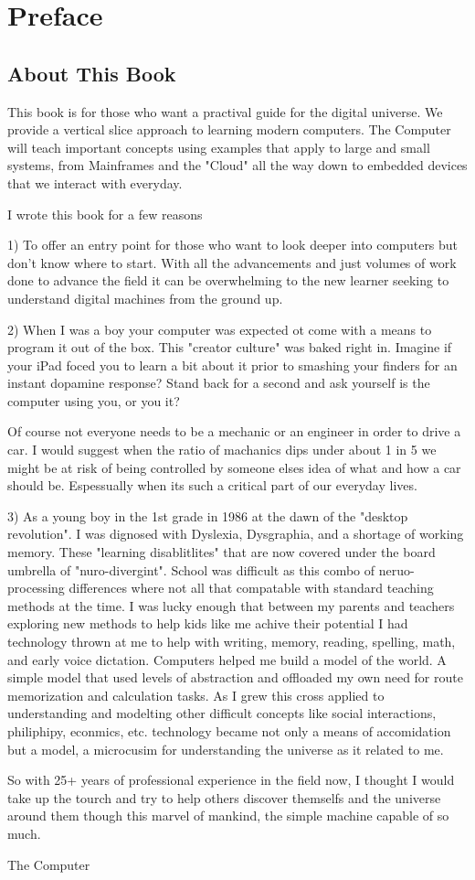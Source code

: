 \chapter{Preface}
\section{About This Book}

This book is for those who want a practival guide for the digital universe. We provide a vertical slice approach to learning modern computers. The Computer will teach important concepts using examples that apply to large and small systems, from Mainframes and the "Cloud" all the way down to embedded devices that we interact with everyday.

I wrote this book for a few reasons

1) To offer an entry point for those who want to  look deeper into computers but don't know where to start. With all the advancements and just volumes of work done to advance the field it can be overwhelming to the new learner seeking to understand digital machines from the ground up.

2) When I was a boy your computer was expected ot come with a means to program it out of the box. This "creator culture" was baked right in. Imagine if your iPad foced you to learn a bit about it prior to smashing your finders for an instant dopamine response? Stand back for a second and ask yourself is the computer using you, or you it?

Of course not everyone needs to be a mechanic or an engineer in order to drive a car. I would suggest when the ratio of machanics dips under about 1 in 5 we might be at risk of being controlled by someone elses idea of what and how a car should be. Espessually when its such a critical part of our everyday lives.

3) As a young boy in the 1st grade in 1986 at the dawn of the "desktop revolution". I was dignosed with Dyslexia, Dysgraphia, and a shortage of working memory. These "learning disablitlites" that are now covered under the board umbrella of "nuro-divergint". School was difficult as this combo of neruo-processing differences where not all that compatable with standard teaching methods at the time. I was lucky enough that between my parents and teachers exploring new methods to help kids like me achive their potential I had technology thrown at me to help with writing, memory, reading, spelling, math, and early voice dictation. Computers helped me build a model of the world. A simple model that used levels of abstraction and offloaded my own need for route memorization and calculation tasks. As I grew this cross applied to understanding and modelting other difficult concepts like social interactions, philiphipy, econmics, etc. technology became not only a means of accomidation but a model, a microcusim for understanding the universe as it related to me.

So with 25+ years of professional experience in the field now, I thought I would take up the tourch and try to help others discover themselfs and the universe around them though this marvel of mankind, the simple machine capable of so much.

The Computer
